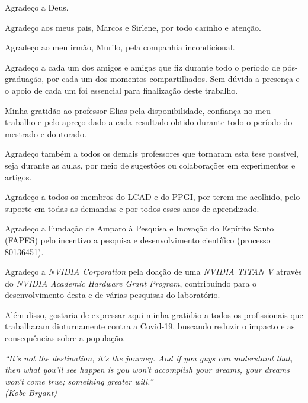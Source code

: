 \documentclass[
	12pt,				%
	openright,			%
	twoside,			%
	a4paper,			%
	english,			%
	french,				%
	spanish,			%
	brazil				%
	]{abntex2}
\begin{document}
\begin{agradecimentos}
Agradeço a Deus.

Agradeço aos meus pais, Marcos e Sirlene, por todo carinho e atenção.

Agradeço ao meu irmão, Murilo, pela companhia incondicional.

Agradeço a cada um dos amigos e amigas que fiz durante todo o período de pós-graduação, por cada um dos momentos compartilhados. Sem dúvida a presença e o apoio de cada um foi essencial para finalização deste trabalho.

Minha gratidão ao professor Elias pela disponibilidade, confiança no meu trabalho e pelo apreço dado a cada resultado obtido durante todo o período do mestrado e doutorado.

Agradeço também a todos os demais professores que tornaram esta tese possível, seja durante as aulas, por meio de sugestões ou colaborações em experimentos e artigos.

Agradeço a todos os membros do LCAD e do PPGI, por terem me acolhido, pelo suporte em todas as demandas e por todos esses anos de aprendizado.

Agradeço a Fundação de Amparo à Pesquisa e Inovação do Espírito Santo (FAPES) pelo incentivo a pesquisa e desenvolvimento científico (processo 80136451).

Agradeço a \textit{NVIDIA Corporation} pela doação de uma \textit{NVIDIA TITAN V} através do \textit{NVIDIA Academic Hardware Grant Program}, contribuindo para o desenvolvimento desta e de várias pesquisas do laboratório.

Além disso, gostaria de expressar aqui minha gratidão a todos os profissionais que trabalharam dioturnamente contra a Covid-19, buscando reduzir o impacto e as consequências sobre a população.

\end{agradecimentos}


\begin{epigrafe}
    \vspace*{\fill}
	\begin{flushright}
		\textit{``It’s not the destination, it’s the journey. And if you guys can understand that, then what you’ll see happen is you won’t accomplish your dreams, your dreams won’t come true; something greater will.''\\
		(Kobe Bryant)}
	\end{flushright}
\end{epigrafe}
\end{document}
